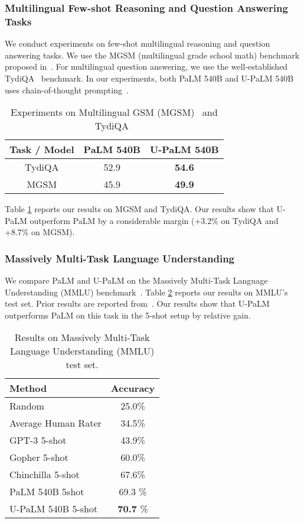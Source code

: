 \documentclass{article}
\newcommand{\frenchblue}[1]{{\color{frenchblue}{#1}}}
\newcommand{\bluegain}[1]{\textbf{\frenchblue{(+#1\%)}}}
\newcommand{\modelname}{U-PaLM\xspace}
\begin{document}
\subsubsection{Multilingual Few-shot Reasoning and Question Answering Tasks}
We conduct experiments on few-shot multilingual reasoning and question answering tasks. We use the MGSM (multilingual grade school math) benchmark proposed in~\citep{shi2022language}. For multilingual question answering, we use the well-established TydiQA~\citep{clark2020tydi} benchmark. In our experiments, both PaLM 540B and \modelname 540B uses chain-of-thought prompting~\citep{wei2022chain}. 
\begin{table}[H]
    \centering
    \small
    \begin{tabular}{c|cc}
    \toprule
  Task /  Model     & PaLM 540B & \modelname 540B \\
    \midrule
      TydiQA   & 52.9 & \textbf{54.6} \bluegain{3.2} \\
      MGSM & 45.9 & \textbf{49.9} \bluegain{8.7} \\ 
      
      
      \bottomrule
    \end{tabular}
    \caption{Experiments on Multilingual GSM (MGSM)~\citep{shi2022language} and TydiQA~\citep{clark2020tydi}}
    \label{tab:multilingual_tasks}
\end{table}
Table \ref{tab:multilingual_tasks} reports our results on MGSM and TydiQA. Our results show that \modelname outperform PaLM by a considerable margin (+3.2\% on TydiQA and +8.7\% on MGSM).

\subsubsection{Massively Multi-Task Language Understanding}
We compare PaLM and \modelname on the Massively Multi-Task Language Understanding (MMLU) benchmark~\citep{hendrycks2020measuring}. Table \ref{tab:mmlu} reports our results on MMLU's test set. Prior results are reported from~\citep{hoffmann2022training}. Our results show that \modelname outperforms PaLM on this task in the 5-shot setup by  relative gain.
\begin{table}[H]
    \centering
    \begin{tabular}{l|c}
    \toprule
    Method & Accuracy \\
    \midrule
      Random  & 25.0\%  \\
    Average Human Rater & 34.5\%\\
    GPT-3 5-shot & 43.9\% \\ 
    Gopher 5-shot & 60.0\% \\ 
    Chinchilla 5-shot & 67.6\% \\
    \midrule
    PaLM 540B 5shot &  69.3 \% \\
    \modelname 540B 5-shot & \textbf{70.7} \% \bluegain{2.0}\\ 
    \bottomrule
    \end{tabular}
    \caption{Results on Massively Multi-Task Language Understanding (MMLU) test set.}
    \label{tab:mmlu}
\end{table}
\end{document}
